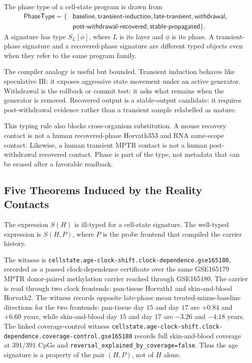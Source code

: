 \begin{definition}
\label{def:phase-type}
The phase type of a cell-state program is drawn from
$$
\begin{aligned}
\mathsf{PhaseType}=\{
&\mathsf{baseline},\mathsf{transient\mbox{-}induction},\mathsf{late\mbox{-}transient},
\mathsf{withdrawal},\\
&\mathsf{post\mbox{-}withdrawal\mbox{-}recovered},\mathsf{stable\mbox{-}propagated}\}.
\end{aligned}
$$
A signature has type $S_L[\phi]$, where $L$ is its layer and $\phi$ is its phase. A transient-phase signature and a recovered-phase signature are different typed objects even when they refer to the same program family.
\end{definition}

The compiler analogy is useful but bounded. Transient induction behaves like speculative IR: it exposes aggressive state movement under an active generator. Withdrawal is the rollback or commit test: it asks what remains when the generator is removed. Recovered output is a stable-output candidate: it requires post-withdrawal evidence rather than a transient sample relabelled as mature.

This typing rule also blocks cross-organism substitution. A mouse recovery contact is not a human recovered-phase Horvath353 and RNA same-scope contact. Likewise, a human transient MPTR contact is not a human post-withdrawal recovered contact. Phase is part of the type, not metadata that can be erased after a favorable readback.

\subsection{Five Theorems Induced by the Reality Contacts}

\begin{proposition}
\label{prop:probe-indexed-signature}
The expression $S(H)$ is ill-typed for a cell-state signature. The well-typed expression is $S(H,P)$, where $P$ is the probe frontend that compiled the carrier history.
\end{proposition}

The witness is \texttt{cellstate.age-clock-shift.clock-dependence.gse165180}, recorded as a passed clock-dependence certificate over the same GSE165179 MPTR donor-paired methylation carrier reached through GSE165180. The carrier is read through two clock frontends: pan-tissue Horvath1 and skin-and-blood Horvath2. The witness records opposite late-phase mean treated-minus-baseline directions for the two frontends: pan-tissue day $15$ and day $17$ are $+0.84$ and $+6.60$ years, while skin-and-blood day $15$ and day $17$ are $-3.26$ and $-4.18$ years. The linked coverage-control witness \texttt{cellstate.age-clock-shift.clock-dependence.coverage-control.gse165180} records full skin-and-blood coverage at $391/391$ CpGs and \texttt{reversal\_explained\_by\_coverage=false}. Thus the age signature is a property of the pair $(H,P)$, not of $H$ alone.

